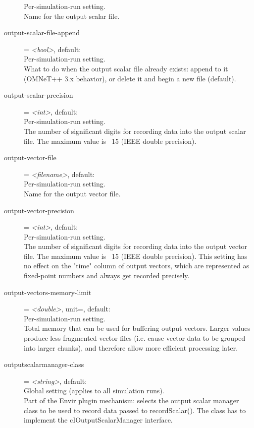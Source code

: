\begin{description}
    Per-simulation-run setting.\\
    Name for the output scalar file.
\item[output-scalar-file-append] = \textit{<bool>}, default: \\
    Per-simulation-run setting.\\
    What to do when the output scalar file already exists: append to it
    (OMNeT++ 3.x behavior), or delete it and begin a new file (default).
\item[output-scalar-precision] = \textit{<int>}, default: \\
    Per-simulation-run setting.\\
    The number of significant digits for recording data into the output scalar
    file. The maximum value is ~15 (IEEE double precision).
\item[output-vector-file] = \textit{<filename>}, default: \\
    Per-simulation-run setting.\\
    Name for the output vector file.
\item[output-vector-precision] = \textit{<int>}, default: \\
    Per-simulation-run setting.\\
    The number of significant digits for recording data into the output vector
    file. The maximum value is ~15 (IEEE double precision). This setting has no
    effect on the "time" column of output vectors, which are represented as
    fixed-point numbers and always get recorded precisely.
\item[output-vectors-memory-limit] = \textit{<double>}, unit=, default: \\
    Per-simulation-run setting.\\
    Total memory that can be used for buffering output vectors. Larger values
    produce less fragmented vector files (i.e. cause vector data to be grouped
    into larger chunks), and therefore allow more efficient processing later.
\item[outputscalarmanager-class] = \textit{<string>}, default: \\
    Global setting (applies to all simulation runs).\\
    Part of the Envir plugin mechanism: selects the output scalar manager class
    to be used to record data passed to recordScalar(). The class has to
    implement the cIOutputScalarManager interface.

\end{description}
